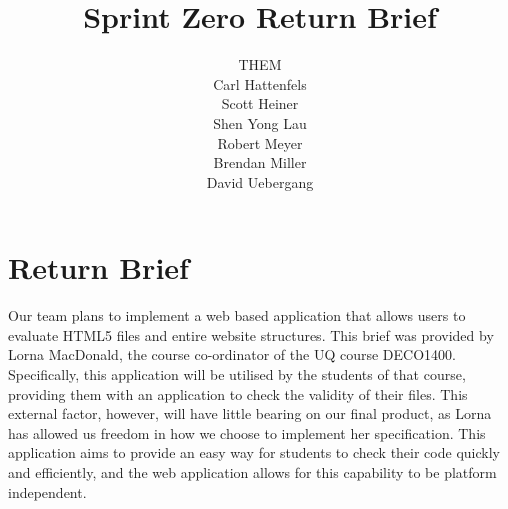 \documentclass[12pt]{article}
\title{\bf Sprint Zero Return Brief}
\author{THEM \\ Carl Hattenfels \\ Scott Heiner \\ Shen Yong Lau \\ Robert Meyer \\ Brendan Miller \\ David Uebergang}
\begin{document}
\maketitle

\section*{Return Brief}

Our team plans to implement a web based application that allows users to evaluate HTML5 files and entire website structures. This brief was provided by Lorna MacDonald, the course co-ordinator of the UQ course DECO1400. Specifically, this application will be utilised by the students of that course, providing them with an application to check the validity of their files. This external factor, however, will have little bearing on our final product, as Lorna has allowed us freedom in how we choose to implement her specification. This application aims to provide an easy way for students to check their code quickly and efficiently, and the web application allows for this capability to be platform independent.
\end{document}
